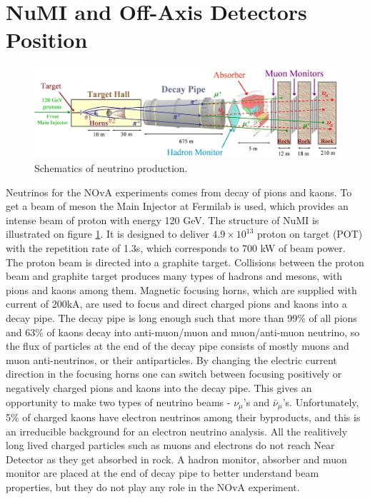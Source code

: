 \section{NuMI and Off-Axis Detectors Position}
\begin{figure}
\includegraphics[width=1.0\textwidth]{figures/Beamline.png}
\centering
\caption{Schematics of neutrino production\cite{numi}.} \label{fig:NuMI}
\end{figure}
Neutrinos for the NOvA experiments comes from decay of pions and kaons. To get a beam of 
meson the Main Injector at Fermilab is used, which provides an intense beam of proton with 
energy 120 GeV. The structure of NuMI is illustrated on figure \ref{fig:NuMI}. It is designed to 
deliver $4.9 \times 10^{13}$ proton on target (POT) with the repetition rate of 1.3s, which 
corresponds to 700 kW of beam power. The proton beam is directed into a graphite target.  
Collisions between the proton beam and graphite target produces many types of hadrons and 
mesons, with pions and kaons among them. Magnetic focusing horns, which are supplied with 
current of 200kA, are used to focus and direct 
charged pions and kaons into a decay pipe. The decay pipe is long enough such that more than 
99\% of all pions 
and 63\% of kaons decay into anti-muon/muon and muon/anti-muon neutrino, so the flux of 
particles at the end of the decay pipe consists of mostly muons and muon anti-neutrinos, or 
their antiparticles. By changing the electric current direction in the focusing horns one can 
switch between focusing positively or negatively charged pions and kaons into the decay pipe. 
This gives an opportunity to make two types of neutrino beams - $\nu_\mu$'s and $\bar{\nu}_\mu$'s. 
Unfortunately, 5\% of charged kaons have electron neutrinos among their byproducts, and this 
is an irreducible background for an electron neutrino analysis. All the realitively long lived
charged particles such as muons and electrons do not reach Near Detector as they get absorbed 
in rock. A hadron monitor, absorber and muon monitor are placed at the end of decay pipe 
to better understand beam properties, but they do not play any role in the NOvA experiment.

